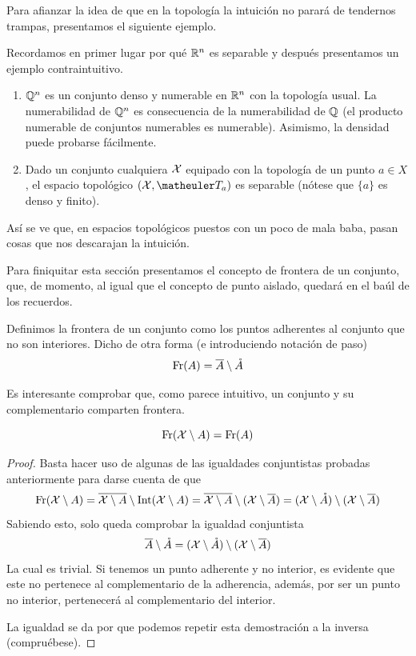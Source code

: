 Para afianzar la idea de que en la topología la intuición no parará de tendernos trampas, presentamos el siguiente ejemplo.
\begin{exa}
	Recordamos en primer lugar por qué $\mathbb{R}^n$ es separable y después presentamos un ejemplo contraintuitivo.
	\begin{enumerate}
		\item $\mathbb{Q}^n$ es un conjunto denso y numerable en $\mathbb{R}^n$ con la topología usual. La numerabilidad de $\mathbb{Q}^n$ es consecuencia de la numerabilidad de $\mathbb{Q}$ (el producto numerable de conjuntos numerables es numerable). Asimismo, la densidad puede probarse fácilmente.
		\item Dado un conjunto cualquiera $\mathcal{X}$ equipado con la topología de un punto $a\in X$, el espacio topológico $(\X,\T_a)$ es separable (nótese que $\{a\}$ es denso y finito).
	\end{enumerate}
	Así se ve que, en espacios topológicos puestos con un poco de mala baba, pasan cosas que nos descarajan la intuición.
\end{exa}
Para finiquitar esta sección presentamos el concepto de frontera de un conjunto, que, de momento, al igual que el concepto de punto aislado, quedará en el baúl de los recuerdos.
\begin{defi}
	Definimos la frontera de un conjunto como los puntos adherentes al conjunto que no son interiores. Dicho de otra forma (e introduciendo notación de paso)
	\begin{equation}
	\operatorname{\mathrm{Fr}}(A)=\overline{A}\setminus\mathring{A}
	\end{equation}
\end{defi}
Es interesante comprobar que, como parece intuitivo, un conjunto y su complementario comparten frontera.
\begin{lem}
	\begin{equation*}
		\operatorname{\mathrm{Fr}}(\mathcal{X} \setminus A)=\operatorname{\mathrm{Fr}}(A)
	\end{equation*}
\end{lem}
\begin{proof}
	Basta hacer uso de algunas de las igualdades conjuntistas probadas anteriormente para darse cuenta de que
	\begin{equation*}
		\operatorname{\mathrm{Fr}}(\mathcal{X} \setminus A)=\overline{\mathcal{X} \setminus A}\setminus \operatorname{\mathrm{Int}}(\mathcal{X} \setminus A)=\overline{\mathcal{X} \setminus A}\setminus (\mathcal{X}\setminus \overline{A})=(\mathcal{X}\setminus\mathring{A})\setminus (\mathcal{X}\setminus \overline{A})
	\end{equation*}
	Sabiendo esto, solo queda comprobar la igualdad conjuntista
	\begin{equation*}
		\overline{A}\setminus\mathring{A}=(\mathcal{X}\setminus\mathring{A})\setminus (\mathcal{X}\setminus \overline{A})
	\end{equation*}
	La cual es trivial. Si tenemos un punto adherente y no interior, es evidente que este no pertenece al complementario de la adherencia, además, por ser un punto no interior, pertenecerá al complementario del interior.
	
	La igualdad se da por que podemos repetir esta demostración a la inversa (compruébese). 
\end{proof}

